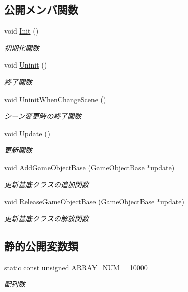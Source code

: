 \subsection*{公開メンバ関数}
\begin{DoxyCompactItemize}
\item 
void \mbox{\hyperlink{class_update_manager_a7b0a2a3bf51d4fcb83fd25fe642fc66b}{Init}} ()
\begin{DoxyCompactList}\small\item\em 初期化関数 \end{DoxyCompactList}\item 
void \mbox{\hyperlink{class_update_manager_a389f9047e882de587eb4def0c691909d}{Uninit}} ()
\begin{DoxyCompactList}\small\item\em 終了関数 \end{DoxyCompactList}\item 
void \mbox{\hyperlink{class_update_manager_a2e0a6b1a620ba620783d929e532b6148}{Uninit\+When\+Change\+Scene}} ()
\begin{DoxyCompactList}\small\item\em シーン変更時の終了関数 \end{DoxyCompactList}\item 
void \mbox{\hyperlink{class_update_manager_ac4bdd39d106c7e6b505fe9a0c55e50de}{Update}} ()
\begin{DoxyCompactList}\small\item\em 更新関数 \end{DoxyCompactList}\item 
void \mbox{\hyperlink{class_update_manager_a47571c441e8494f8e8231d600fd483ae}{Add\+Game\+Object\+Base}} (\mbox{\hyperlink{class_game_object_base}{Game\+Object\+Base}} $\ast$update)
\begin{DoxyCompactList}\small\item\em 更新基底クラスの追加関数 \end{DoxyCompactList}\item 
void \mbox{\hyperlink{class_update_manager_ae74872df6b8761ac78744be1211da791}{Release\+Game\+Object\+Base}} (\mbox{\hyperlink{class_game_object_base}{Game\+Object\+Base}} $\ast$update)
\begin{DoxyCompactList}\small\item\em 更新基底クラスの解放関数 \end{DoxyCompactList}\end{DoxyCompactItemize}
\subsection*{静的公開変数類}
\begin{DoxyCompactItemize}
\item 
static const unsigned \mbox{\hyperlink{class_update_manager_a280b884fb6a025cfd92d4f93086c60c6}{A\+R\+R\+A\+Y\+\_\+\+N\+UM}} = 10000
\begin{DoxyCompactList}\small\item\em 配列数 \end{DoxyCompactList}\end{DoxyCompactItemize}
